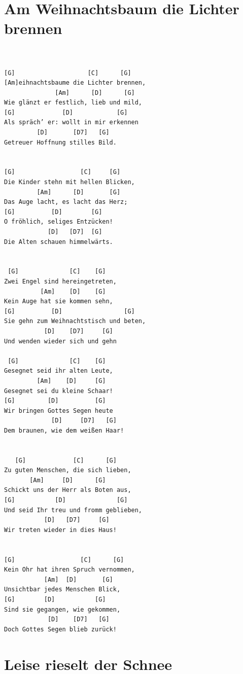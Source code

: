 \documentclass[
]{book}
\let\stdsection\section
\renewcommand\section{\clearpage\stdsection}
\begin{document}
\hypertarget{am-weihnachtsbaum-die-lichter-brennen}{%
\section{Am Weihnachtsbaum die Lichter brennen}\label{am-weihnachtsbaum-die-lichter-brennen}}

\begin{verbatim}


[G]                    [C]      [G]
[Am]eihnachtsbaume die Lichter brennen,
              [Am]      [D]      [G]
Wie glänzt er festlich, lieb und mild,
[G]             [D]            [G]
Als spräch’ er: wollt in mir erkennen
         [D]       [D7]   [G]
Getreuer Hoffnung stilles Bild.


[G]                  [C]     [G]
Die Kinder stehn mit hellen Blicken,
         [Am]      [D]       [G]
Das Auge lacht, es lacht das Herz;
[G]          [D]        [G]
O fröhlich, seliges Entzücken!
            [D]   [D7]  [G]
Die Alten schauen himmelwärts.


 [G]              [C]    [G]
Zwei Engel sind hereingetreten,
          [Am]    [D]    [G]
Kein Auge hat sie kommen sehn,
[G]          [D]                 [G]
Sie gehn zum Weihnachtstisch und beten,
           [D]    [D7]     [G]
Und wenden wieder sich und gehn
 
 [G]              [C]    [G]
Gesegnet seid ihr alten Leute,
         [Am]    [D]     [G]
Gesegnet sei du kleine Schaar!
[G]         [D]          [G]
Wir bringen Gottes Segen heute
             [D]     [D7]   [G]
Dem braunen, wie dem weißen Haar!


   [G]             [C]      [G]
Zu guten Menschen, die sich lieben,
       [Am]     [D]      [G]
Schickt uns der Herr als Boten aus,
[G]           [D]              [G]
Und seid Ihr treu und fromm geblieben,
           [D]   [D7]     [G]
Wir treten wieder in dies Haus!
 

[G]                  [C]      [G]
Kein Ohr hat ihren Spruch vernommen,
           [Am]  [D]       [G]
Unsichtbar jedes Menschen Blick,
[G]        [D]           [G]
Sind sie gegangen, wie gekommen,
            [D]    [D7]   [G]
Doch Gottes Segen blieb zurück!
\end{verbatim}

\hypertarget{leise-rieselt-der-schnee}{%
\section{Leise rieselt der Schnee}\label{leise-rieselt-der-schnee}}
\end{document}
